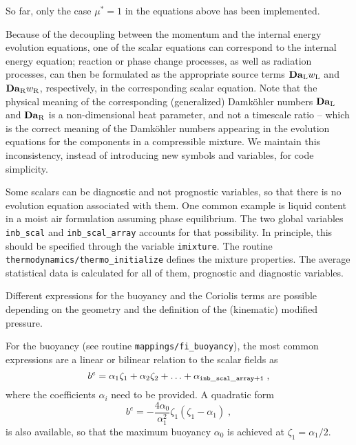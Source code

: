 So far, only the case $\mu^*=1$ in the equations above has been implemented.

Because of the decoupling between the momentum and the internal energy evolution equations, one of the scalar equations can correspond to the internal energy equation; reaction or phase change processes, as well as radiation processes, can then be formulated as the appropriate source terms $\mathrm{\bf   Da}_\mathrm{L}w_\mathrm{L}$ and $\mathrm{\bf Da}_\mathrm{R}w_\mathrm{R}$, respectively, in the corresponding scalar equation. Note that the physical meaning of the corresponding (generalized) Damk{\"o}hler numbers $\mathrm{\bf   Da}_\mathrm{L}$ and $\mathrm{\bf Da}_\mathrm{R}$ is a non-dimensional heat parameter, and not a timescale ratio -- which is the correct meaning of the Damk{\"o}hler numbers appearing in the evolution equations for the components in a compressible mixture. We maintain this inconsistency, instead of introducing new symbols and variables, for code simplicity.

Some scalars can be diagnostic and not prognostic variables, so that there is no evolution equation associated with them. One common example is liquid content in a moist air formulation assuming phase equilibrium. The two global variables {\tt inb\_scal} and {\tt inb\_scal\_array} accounts for that possibility. In principle, this should be specified through the variable {\tt imixture}. The routine {\tt thermodynamics/thermo\_initialize} defines the mixture properties. The average statistical data is calculated for all of them, prognostic and diagnostic variables.

Different expressions for the buoyancy and the Coriolis terms are possible depending on the geometry and the definition of the (kinematic) modified pressure.

For the buoyancy (see routine {\tt mappings/fi\_buoyancy}), the most common expressions are a linear or bilinear relation to the scalar fields as
\begin{equation}
  b^e=\alpha_1\zeta_1+\alpha_2\zeta_2+\ldots+\alpha_\mathrm{\tt inb\_scal\_array+1}\;,
\end{equation}
where the coefficients $\alpha_i$ need to be provided. A quadratic form
\begin{equation}
  b^e=-\frac{4\alpha_0}{\alpha_1^2}\zeta_1(\zeta_1-\alpha_1) \;,
\end{equation}
is also available, so that the maximum buoyancy $\alpha_0$ is achieved at
$\zeta_1=\alpha_1/2$.

